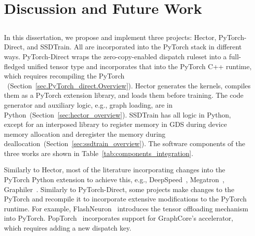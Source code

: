 \chapter{Discussion and Future Work}\label{ch:future_work}


\section{}
\label{sec:discuss_pytorch_integration}

In this dissertation, we propose and implement three projects: Hector, PyTorch-Direct, and SSDTrain. All are incorporated into the PyTorch stack in different ways. 
PyTorch-Direct wraps the zero-copy-enabled dispatch ruleset into a full-fledged unified tensor type and incorporates that into the PyTorch C++ runtime, which requires recompiling the PyTorch ~(Section~\ref{sec.PyTorch_direct.Overview}).
Hector generates the kernels, compiles them as a PyTorch extension library, and loads them before training. The code generator and auxiliary logic, e.g., graph loading, are in Python~(Section~\ref{sec:hector_overview}).
SSDTrain has all logic in Python, except for an interposed library to register memory in GDS during device memory allocation and deregister the memory during deallocation~(Section~\ref{sec:ssdtrain_overview}). The software components of the three works are shown in Table~\ref{tab:components_integration}. 

Similarly to Hector, most of the literature incorporating changes into the PyTorch   Python extension  to achieve this, e.g., DeepSpeed~\cite{rasleyDeepSpeedSystemOptimizations2020}, Megatron~\cite{shoeybiMegatronLMTrainingMultiBillion2020a}, Graphiler~\cite{xieGraphilerCompilerGraph}. Similarly to PyTorch-Direct, some projects make changes to the PyTorch  and recompile it to incorporate extensive modifications to the PyTorch runtime. For example, FlashNeuron~\cite{baeFlashNeuronSSDEnabledLargeBatch2021} introduces the tensor offloading mechanism into PyTorch. PopTorch~\cite{anthonybarbierAddNewKeys2022} incorporates support for GraphCore's accelerator, which requires adding a new dispatch key.

